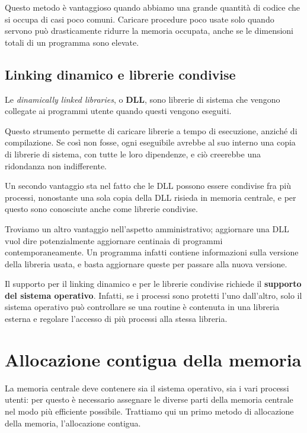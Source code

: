         Questo metodo è vantaggioso quando abbiamo una grande quantità di codice che si occupa di casi poco comuni. Caricare procedure poco usate solo quando servono può drasticamente ridurre la memoria occupata, anche se le dimensioni totali di un programma sono elevate.
        
    \subsection{Linking dinamico e librerie condivise}
        Le \textit{dinamically linked libraries}, o \textbf{DLL}, sono librerie di sistema che vengono collegate ai programmi utente quando questi vengono eseguiti.
        
        Questo strumento permette di caricare librerie a tempo di esecuzione, anziché di compilazione. Se così non fosse, ogni eseguibile avrebbe al suo interno una copia di librerie di sistema, con tutte le loro dipendenze, e ciò creerebbe una ridondanza non indifferente.
        
        Un secondo vantaggio sta nel fatto che le DLL possono essere condivise fra più processi, nonostante una sola copia della DLL risieda in memoria centrale, e per questo sono conosciute anche come librerie condivise.
        
        Troviamo un altro vantaggio nell'aspetto amministrativo; aggiornare una DLL vuol dire potenzialmente aggiornare centinaia di programmi contemporaneamente. Un programma infatti contiene informazioni sulla versione della libreria usata, e basta aggiornare queste per passare alla nuova versione.
        
        Il supporto per il linking dinamico e per le librerie condivise richiede il \textbf{supporto del sistema operativo}. Infatti, se i processi sono protetti l'uno dall'altro, solo il sistema operativo può controllare se una routine è contenuta in una libreria esterna e regolare l'accesso di più processi alla stessa libreria.

\section{Allocazione contigua della memoria}
    La memoria centrale deve contenere sia il sistema operativo, sia i vari processi utenti: per questo è necessario assegnare le diverse parti della memoria centrale nel modo più efficiente possibile. Trattiamo qui un primo metodo di allocazione della memoria, l'allocazione contigua.
    
